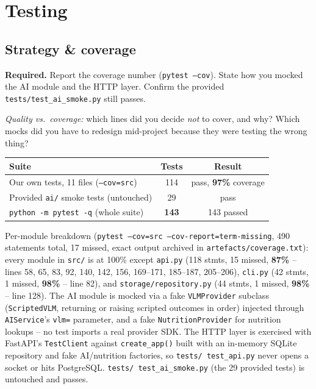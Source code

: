 \documentclass[11pt,a4paper]{article}
\newenvironment{deliverbox}{\begin{deliverboxshown}}{\end{deliverboxshown}}
\newenvironment{probebox}{\begin{probeboxshown}}{\end{probeboxshown}}
\newenvironment{deliverbox}{\setbox0\vbox\bgroup}{\egroup\ignorespacesafterend}
\newenvironment{probebox}{\setbox0\vbox\bgroup}{\egroup\ignorespacesafterend}
\begin{document}
\section{Testing}\label{sec:testing}

\subsection{Strategy \& coverage}

\begin{deliverbox}
\textbf{Required.} Report the coverage number (\texttt{pytest --cov}). State how you mocked the AI module and the HTTP layer. Confirm the provided \texttt{tests/test\_ai\_smoke.py} still passes.
\end{deliverbox}

\begin{probebox}
\textit{Quality vs.\ coverage:} which lines did you decide \emph{not} to cover, and why? Which mocks did you have to redesign mid-project because they were testing the wrong thing?
\end{probebox}

\begin{center}\small
\begin{tabular}{lcc}
\toprule
\textbf{Suite} & \textbf{Tests} & \textbf{Result} \\
\midrule
Our own tests, 11 files (\texttt{--cov=src}) & 114 & pass, \textbf{97\%} coverage \\
Provided \texttt{ai/} smoke tests (untouched) & \phantom{0}29 & pass \\
\midrule
\texttt{python -m pytest -q} (whole suite) & \textbf{143} & 143 passed \\
\bottomrule
\end{tabular}
\end{center}

\par\noindent
Per-module breakdown (\texttt{pytest --cov=src --cov-report=term-missing},
490 statements total, 17 missed, exact output archived in
\texttt{artefacts/coverage.txt}): every module in \texttt{src/} is at 100\%
except \texttt{api.py} (118 stmts, 15 missed, \textbf{87\%} -- lines 58, 65,
83, 92, 140, 142, 156, 169--171, 185--187, 205--206), \texttt{cli.py} (42
stmts, 1 missed, \textbf{98\%} -- line 82), and
\texttt{storage/repository.py} (44 stmts, 1 missed, \textbf{98\%} -- line
128). The AI module is mocked via a fake \texttt{VLMProvider} subclass
(\texttt{ScriptedVLM}, returning or raising scripted outcomes in order)
injected through \texttt{AIService}'s \texttt{vlm=} parameter, and a fake
\texttt{NutritionProvider} for nutrition lookups -- no test imports a real
provider SDK. The HTTP layer is exercised with FastAPI's
\texttt{TestClient} against \texttt{create\_app()} built with an in-memory
SQLite repository and fake AI/nutrition factories, so \texttt{tests/
test\_api.py} never opens a socket or hits PostgreSQL. \texttt{tests/
test\_ai\_smoke.py} (the 29 provided tests) is untouched and passes.
\end{document}
